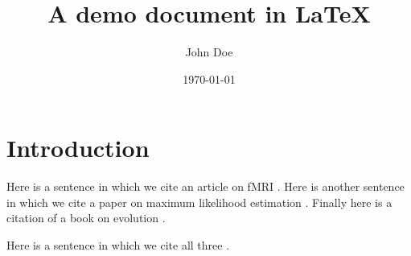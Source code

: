 \documentclass{article}
\title{A demo document in \LaTeX{}}
\author{John Doe}
\date{\today}
\begin{document}
\maketitle

\section*{Introduction}

Here is a sentence in which we cite an article on fMRI
\cite{poldrack2012future}. Here is another sentence in which we cite a
paper on maximum likelihood estimation
\cite{myung2003tutorial}. Finally here is a citation of a book on
evolution \cite{dawkins1996blind}.

Here is a sentence in which we cite all three
\cite{poldrack2012future,myung2003tutorial,dawkins1996blind}.



\end{document}
